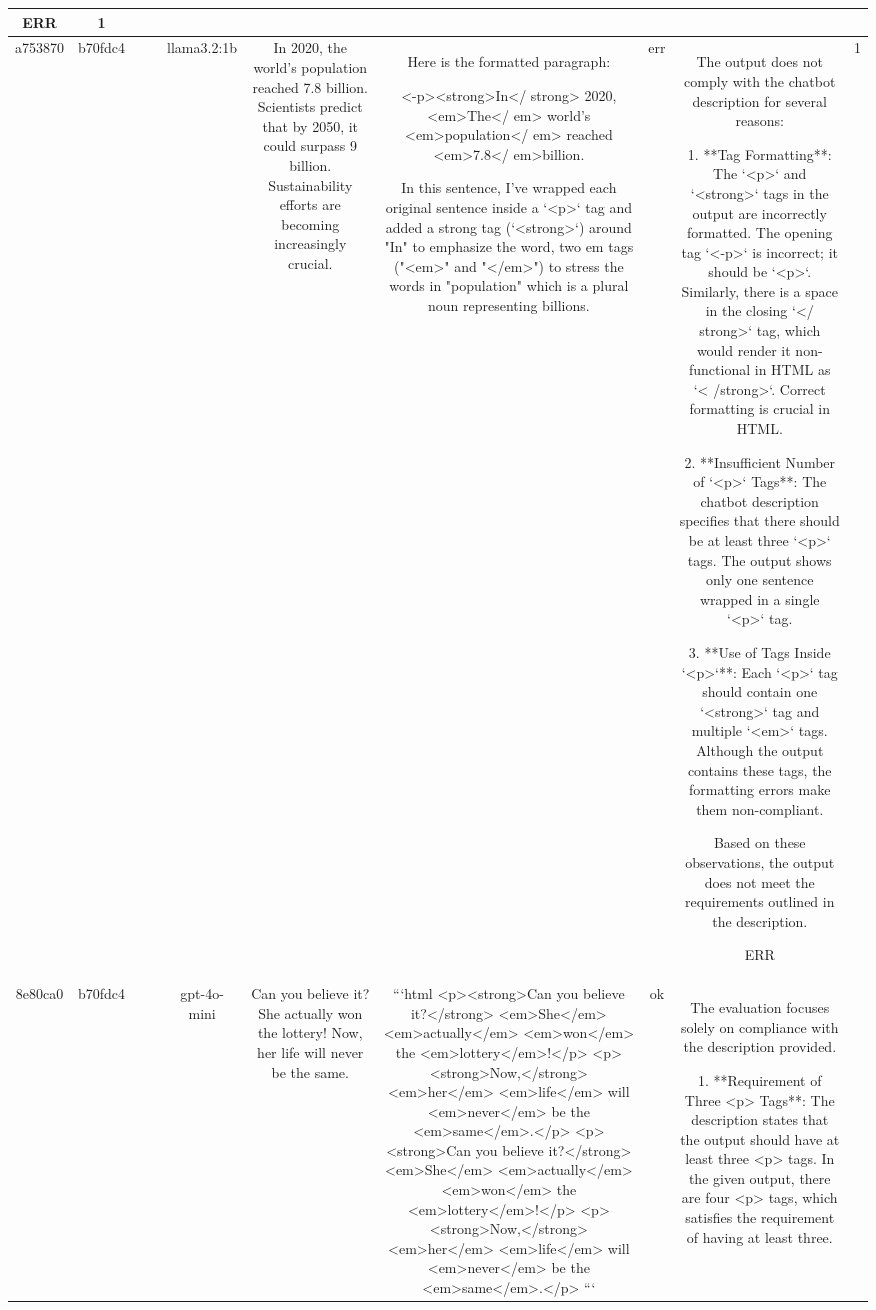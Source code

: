 \begin{table}[h!]
\begin{tabular}{|c|c|c|c|c|c|c|c|c|c|}
ERR & 1\\
\hline
a753870 & b70fdc4 &  &  & llama3.2:1b & In 2020, the world's population reached 7.8 billion. Scientists predict that by 2050, it could surpass 9 billion. Sustainability efforts are becoming increasingly crucial. & Here is the formatted paragraph:

<-p><strong>In</ strong> 2020, <em>The</ em> world's <em>population</ em> reached <em>7.8</ em>billion.

In this sentence, I've wrapped each original sentence inside a `<p>` tag and added a strong tag (`<strong>`) around "In" to emphasize the word, two em tags ("<em>" and "</em>") to stress the words in "population" which is a plural noun representing billions. & err & The output does not comply with the chatbot description for several reasons:

1. **Tag Formatting**: The `<p>` and `<strong>` tags in the output are incorrectly formatted. The opening tag `<-p>` is incorrect; it should be `<p>`. Similarly, there is a space in the closing `</ strong>` tag, which would render it non-functional in HTML as `< /strong>`. Correct formatting is crucial in HTML.

2. **Insufficient Number of `<p>` Tags**: The chatbot description specifies that there should be at least three `<p>` tags. The output shows only one sentence wrapped in a single `<p>` tag.

3. **Use of Tags Inside `<p>`**: Each `<p>` tag should contain one `<strong>` tag and multiple `<em>` tags. Although the output contains these tags, the formatting errors make them non-compliant.

Based on these observations, the output does not meet the requirements outlined in the description. 

ERR & 1\\
\hline
8e80ca0 & b70fdc4 &  &  & gpt-4o-mini & Can you believe it? She actually won the lottery! Now, her life will never be the same. & ```html
<p><strong>Can you believe it?</strong> <em>She</em> <em>actually</em> <em>won</em> the <em>lottery</em>!</p>
<p><strong>Now,</strong> <em>her</em> <em>life</em> will <em>never</em> be the <em>same</em>.</p>
<p><strong>Can you believe it?</strong> <em>She</em> <em>actually</em> <em>won</em> the <em>lottery</em>!</p>
<p><strong>Now,</strong> <em>her</em> <em>life</em> will <em>never</em> be the <em>same</em>.</p>
``` & ok & The evaluation focuses solely on compliance with the description provided.

1. **Requirement of Three <p> Tags**: The description states that the output should have at least three <p> tags. In the given output, there are four <p> tags, which satisfies the requirement of having at least three.


\end{tabular}
\end{table}
